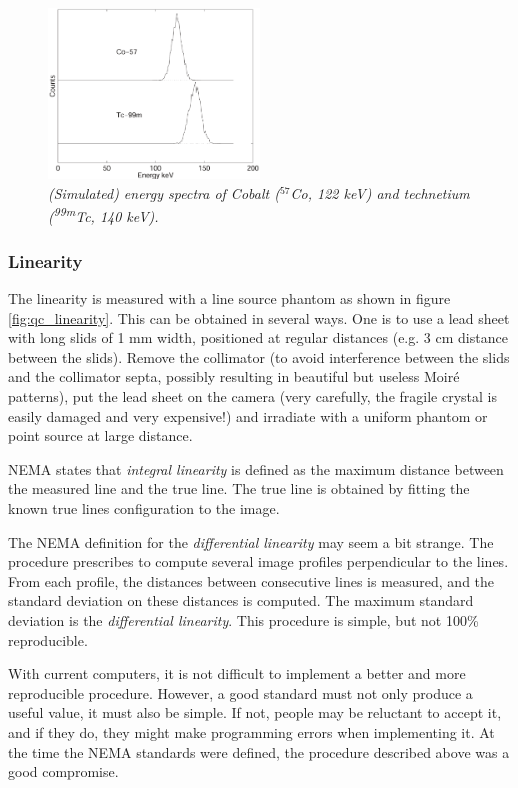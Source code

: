\documentclass[11pt,oneside]{book}
\begin{document}
\begin{figure}[tb]
\centering
\includegraphics[width=0.5\textwidth]{figs/fig_qc_enresol.pdf}
\caption{\label{fig:qc_enresol} \emph{(Simulated) energy spectra of Cobalt
($^{57}$Co, 122 keV) and technetium (\textsuperscript{99m}Tc, 140 keV).}}
\end{figure}

\subsubsection{Linearity}
The linearity is measured with a line source phantom as shown in
figure \ref{fig:qc_linearity}. This can be obtained in several
ways. One is to use a lead sheet with long slids of 1 mm width,
positioned at regular distances (e.g. 3 cm distance between the
slids). Remove the collimator (to avoid interference between the slids
and the collimator septa, possibly resulting in beautiful but useless
Moir\'e patterns), put the lead sheet on the camera (very carefully,
the fragile crystal is easily damaged and very expensive!) and
irradiate with a uniform phantom or point source at large distance.

NEMA states that {\em integral linearity} is defined as the maximum distance
between the measured line and the true line. The true line is obtained by
fitting the known true lines configuration to the image.

The NEMA definition for the {\em differential linearity} may seem a bit
strange. The procedure prescribes to compute several image profiles
perpendicular to the lines. From each profile, the distances between
consecutive lines is measured, and the standard deviation on these distances is
computed. The maximum standard deviation is the {\em differential linearity}.
This procedure is simple, but not 100\% reproducible.

With current computers, it is not difficult to implement a better and more
reproducible procedure. However, a good standard must not only produce a
useful value, it must also be simple. If not, people may be reluctant to
accept it, and if they do, they might make programming errors when
implementing it. At the time the NEMA standards were defined, the procedure
described above was a good compromise.
\end{document}
